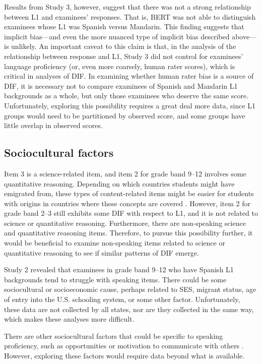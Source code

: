 \documentclass [PhD] {uclathes}
\begin{document}
Results from Study 3, however, suggest that there was not a strong relationship between L1 and examinees’ responses. That is, BERT was not able to distinguish examinees whose L1 was Spanish versus Mandarin. This finding suggests that implicit bias—and even the more nuanced type of implicit bias described above—is unlikely. An important caveat to this claim is that, in the analysis of the relationship between response and L1, Study 3 did not control for examinees’ language proficiency (or, even more coarsely, human rater scores), which is critical in analyses of DIF. In examining whether human rater bias is a source of DIF, it is necessary not to compare examinees of Spanish and Mandarin L1 backgrounds as a whole, but only those examinees who deserve the same score. Unfortunately, exploring this possibility requires a great deal more data, since L1 groups would need to be partitioned by observed score, and some groups have little overlap in observed scores. 

\subsection{Sociocultural factors}

Item 3 is a science-related item, and item 2 for grade band 9–12 involves some quantitative reasoning. Depending on which countries students might have emigrated from, these types of content-related items might be easier for students with origins in countries where these concepts are covered \citep{huang2016exploring}. However, item 2 for grade band 2–3 still exhibits some DIF with respect to L1, and it is not related to science or quantitative reasoning. Furthermore, there are non-speaking science and quantitative reasoning items. Therefore, to pursue this possibility further, it would be beneficial to examine non-speaking items related to science or quantitative reasoning to see if similar patterns of DIF emerge. 

Study 2 revealed that examinees in grade band 9–12 who have Spanish L1 backgrounds tend to struggle with speaking items. There could be some sociocultural or socioeconomic cause, perhaps related to SES, migrant status, age of entry into the U.S. schooling system, or some other factor. Unfortunately, these data are not collected by all states, nor are they collected in the same way, which makes these analyses more difficult. 

There are other sociocultural factors that could be specific to speaking proficiency, such as opportunities or motivation to communicate with others \citep{derwing2013development}. However, exploring these factors would require data beyond what is available. 
\end{document}
